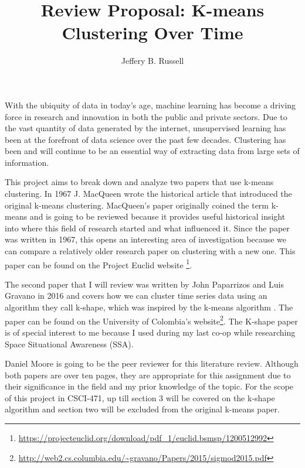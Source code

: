 \documentclass[12pt]{apa6}
\title{Review Proposal: K-means Clustering Over Time}
\author{Jeffery B. Russell}
\affiliation{%
 Fourth Year Computer Science Student at RIT\\
 CUBRC Research Assistant\\
 RITlug President
}%
\begin{document}
\maketitle


With the ubiquity of data in today's age, machine learning has become a driving force in research and innovation in both the public and private sectors. Due to the vast quantity of data generated by the internet, unsupervised learning has been at the forefront of data science over the past few decades. Clustering has been and will continue to be an essential way of extracting data from large sets of information.

This project aims to break down and analyze two papers that use k-means clustering. In 1967 J. MacQueen wrote the historical article that introduced \cite{k-means} the original k-means clustering. MacQueen's paper originally coined the term k-means\cite{k-means} and is going to be reviewed because it provides useful historical insight into where this field of research started and what influenced it. Since the paper was written in 1967, this opens an interesting area of investigation because we can compare a relatively older research paper on clustering with a new one. This paper can be found on the Project Euclid website \footnote{\url{https://projecteuclid.org/download/pdf_1/euclid.bsmsp/1200512992}}.

The second paper that I will review was written by John Paparrizos and Luis Gravano in 2016 and covers how we can cluster time series data using an algorithm they call k-shape, which was inspired by the k-means algorithm \cite{k-shape}. The paper can be found on the University of Colombia's website\footnote{\url{http://web2.cs.columbia.edu/~gravano/Papers/2015/sigmod2015.pdf}}.
The K-shape paper is of special interest to me because I used during my last co-op while researching Space Situational Awareness (SSA).

Daniel Moore is going to be the peer reviewer for this literature review.
Although both papers are over ten pages, they are appropriate for this assignment due to their significance in the field and my prior knowledge of the topic. For the scope of this project in CSCI-471, up till section 3 will be covered on the k-shape algorithm and section two will be excluded from the original k-means paper. 




\end{document}
